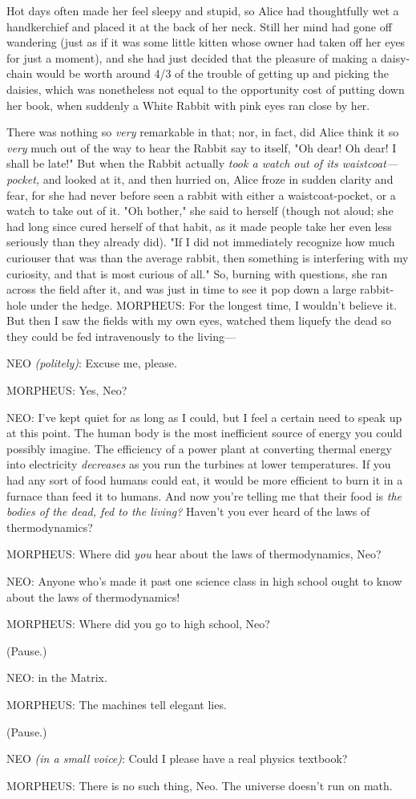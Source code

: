 Hot days often made her feel sleepy and stupid, so Alice had thoughtfully wet a
handkerchief and placed it at the back of her neck. Still her mind had gone off
wandering (just as if it was some little kitten whose owner had taken off her
eyes for just a moment), and she had just decided that the pleasure of making a
daisy-chain would be worth around 4/3 of the trouble of getting up and picking
the daisies, which was nonetheless not equal to the opportunity cost of putting
down her book, when suddenly a White Rabbit with pink eyes ran close by her.

There was nothing so \emph{very} remarkable in that; nor, in fact, did Alice
think it so \emph{very} much out of the way to hear the Rabbit say to itself,
"Oh dear! Oh dear! I shall be late!" But when the Rabbit actually \emph{took a
watch out of its waistcoat—pocket,} and looked at it, and then hurried on,
Alice froze in sudden clarity and fear, for she had never before seen a rabbit
with either a waistcoat-pocket, or a watch to take out of it. "Oh bother," she
said to herself (though not aloud; she had long since cured herself of that
habit, as it made people take her even less seriously than they already did).
"If I did not immediately recognize how much curiouser that was than the
average rabbit, then something is interfering with my curiosity, and that is
most curious of all." So, burning with questions, she ran across the field
after it, and was just in time to see it pop down a large rabbit-hole under the
hedge.
\sbreak
MORPHEUS: For the longest time, I wouldn't believe it. But then I saw the
fields with my own eyes, watched them liquefy the dead so they could be fed
intravenously to the living—

NEO \emph{(politely)}: Excuse me, please.

MORPHEUS: Yes, Neo?

NEO: I've kept quiet for as long as I could, but I feel a certain need to speak
up at this point. The human body is the most inefficient source of energy you
could possibly imagine. The efficiency of a power plant at converting thermal
energy into electricity \emph{decreases} as you run the turbines at lower
temperatures. If you had any sort of food humans could eat, it would be more
efficient to burn it in a furnace than feed it to humans. And now you're
telling me that their food is \emph{the bodies of the dead, fed to the living?}
Haven't you ever heard of the laws of thermodynamics?

MORPHEUS: Where did \emph{you} hear about the laws of thermodynamics, Neo?

NEO: Anyone who's made it past one science class in high school ought to know
about the laws of thermodynamics!

MORPHEUS: Where did you go to high school, Neo?

(Pause.)

NEO: {\el}in the Matrix.

MORPHEUS: The machines tell elegant lies.

(Pause.)

NEO \emph{(in a small voice)}: Could I please have a real physics textbook?

MORPHEUS: There is no such thing, Neo. The universe doesn't run on math.
